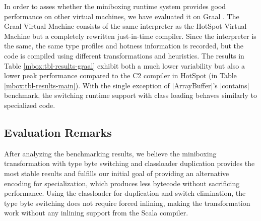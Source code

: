 In order to asses whether the miniboxing runtime system provides good performance on other virtual machines, we have evaluated it on Graal \cite{graal}. The Graal Virtual Machine consists of the same interpreter as the HotSpot Virtual Machine but a completely rewritten just-in-time compiler. Since the interpreter is the same, the same type profiles and hotness information is recorded, but the code is compiled using different transformations and heuristics. The results in Table \ref{mbox:tbl-results-graal} exhibit both a much lower variability but also a lower peak performance compared to the C2 compiler in HotSpot (in Table \ref{mbox:tbl-results-main}). With the single exception of |ArrayBuffer|'s |contains| benchmark, the switching runtime support with class loading behaves similarly to specialized code.

\subsection{Evaluation Remarks}
\label{mbox:subsec-eval-remarks}

After analyzing the benchmarking results, we believe the miniboxing transformation with type byte switching and classloader duplication provides the most stable results and fulfills our initial goal of providing an alternative encoding for specialization, which produces less bytecode without sacrificing performance. Using the classloader for duplication and switch elimination, the type byte switching does not require forced inlining, making the transformation work without any inlining support from the Scala compiler.
